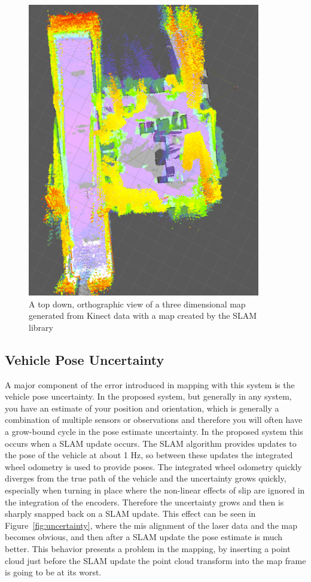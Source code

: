 \documentclass[12pt]{report}
\begin{document}
\begin{figure}[ht]
  \centering
  \includegraphics[width=4in,keepaspectratio]{slamvsoctree.pdf}
  \caption{A top down, orthographic view of a three dimensional map generated from Kinect data with a map created by the SLAM library}
  \label{fig:slamvsoctree}
\end{figure}

\subsection{Vehicle Pose Uncertainty}
A major component of the error introduced in mapping with this system is the vehicle pose uncertainty.  In the proposed system, but generally in any system, you have an estimate of your position and orientation, which is generally a combination of multiple sensors or observations and therefore you will often have a grow-bound cycle in the pose estimate uncertainty.  In the proposed system this occurs when a SLAM update occurs.  The SLAM algorithm provides updates to the pose of the vehicle at about 1 Hz, so between these updates the integrated wheel odometry is used to provide poses.  The integrated wheel odometry quickly diverges from the true path of the vehicle and the uncertainty grows quickly, especially when turning in place where the non-linear effects of slip are ignored in the integration of the encoders.  Therefore the uncertainty grows and then is sharply snapped back on a SLAM update.  This effect can be seen in Figure~\ref{fig:uncertainty}, where the mis alignment of the laser data and the map becomes obvious, and then after a SLAM update the pose estimate is much better.  This behavior presents a problem in the mapping, by inserting a point cloud just before the SLAM update the point cloud transform into the map frame is going to be at its worst.
\end{document}
